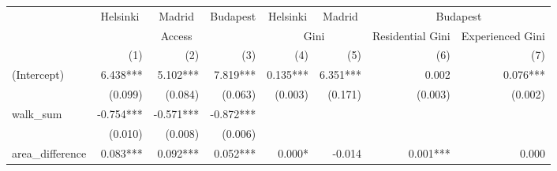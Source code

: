 \begin{tabular}{lrrrrrrr}
\toprule
                      & \multicolumn{1}{c}{Helsinki} & \multicolumn{1}{c}{Madrid} & \multicolumn{1}{c}{Budapest} & \multicolumn{1}{c}{Helsinki} & \multicolumn{1}{c}{Madrid} &                         \multicolumn{2}{c}{Budapest}                        \\ 
\cmidrule(lr){2-2} \cmidrule(lr){3-3} \cmidrule(lr){4-4} \cmidrule(lr){5-5} \cmidrule(lr){6-6} \cmidrule(lr){7-8} 
                      &                                \multicolumn{3}{c}{Access}                                &                  \multicolumn{2}{c}{Gini}                 & \multicolumn{1}{c}{Residential Gini} & \multicolumn{1}{c}{Experienced Gini} \\ 
\cmidrule(lr){2-4} \cmidrule(lr){5-6} \cmidrule(lr){7-7} \cmidrule(lr){8-8} 
                      &                          (1) &                        (2) &                          (3) &                          (4) &                        (5) &                                  (6) &                                  (7) \\ 
\midrule
(Intercept)           &                     6.438*** &                   5.102*** &                     7.819*** &                     0.135*** &                   6.351*** &                                0.002 &                             0.076*** \\ 
                      &                      (0.099) &                    (0.084) &                      (0.063) &                      (0.003) &                    (0.171) &                              (0.003) &                              (0.002) \\ 
walk\_sum             &                    -0.754*** &                  -0.571*** &                    -0.872*** &                              &                            &                                      &                                      \\ 
                      &                      (0.010) &                    (0.008) &                      (0.006) &                              &                            &                                      &                                      \\ 
area\_difference      &                     0.083*** &                   0.092*** &                     0.052*** &                       0.000* &                     -0.014 &                             0.001*** &                                0.000 \\ 

\end{tabular}
